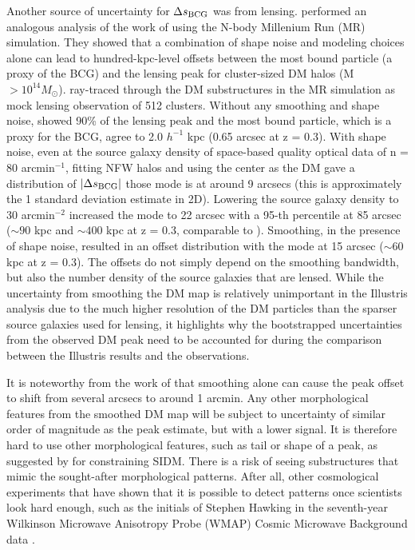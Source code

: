 Another source of uncertainty for $\Delta s_{\rm BCG}$ was from lensing. 
\cite{Dietrich2012} performed an analogous analysis of the work of \cite{Oguri2010} 
using the N-body Millenium Run (MR) simulation.
They showed that a combination of shape noise and modeling choices 
alone can lead to hundred-kpc-level offsets between the most bound particle 
(a proxy of the BCG) and the lensing peak for cluster-sized DM halos 
(M $> 10^{14 }M_\odot$).  
\cite{Dietrich2012} ray-traced through the DM substructures in the MR simulation 
as mock lensing observation of 512 clusters.  
Without any smoothing and shape noise, \cite{Dietrich2012} showed 
90\% of the lensing peak and the 
most bound particle, which is a proxy for the BCG, agree to 2.0 $h^{-1}$ kpc
(0.65 arcsec at z = 0.3). 
With shape noise,
even at the source galaxy density of space-based quality optical data of n = 80
arcmin$^{-1}$, fitting NFW halos and using the center as the DM gave a 
distribution of $|\Delta s_{\rm BCG}|$ those mode is at around 9 arcsecs (this is
approximately the 1 standard deviation estimate in 2D). 
Lowering the source galaxy density to 30 arcmin$^{-2}$ increased the mode
to 22 arcsec with a 95-th percentile at 85 arcsec 
($\sim 90$ kpc and $\sim 400$ kpc at z = 0.3, comparable to \citealt{Oguri2010}). 
Smoothing, in the presence of shape noise,
resulted in an offset distribution with the mode at
15 arcsec ($\sim 60$ kpc at z = 0.3). 
The offsets do not simply depend on the smoothing bandwidth, 
but also the number density of the source galaxies that are lensed. 
While the uncertainty from smoothing the DM map is
relatively unimportant in the Illustris analysis due to the much higher resolution 
of the DM particles than the sparser source galaxies used for lensing, it
highlights why the bootstrapped uncertainties from the observed
DM peak need to be accounted for during the comparison between the
Illustris results and the observations.

It is noteworthy from the work of \cite{Dietrich2012} that 
smoothing alone can cause the peak offset to shift from several arcsecs to
around 1 arcmin.
Any other morphological features from the smoothed DM map will be subject 
to uncertainty of similar order of magnitude as the peak
estimate, but with a lower signal. 
It is therefore hard to use other morphological features, such as tail or shape 
of a peak,
as suggested by \cite{Kahlhoefer14} for constraining SIDM.
There is a risk of seeing substructures that mimic the sought-after 
morphological patterns. After all, other cosmological experiments 
that have shown
that it is possible to detect patterns once scientists look hard enough, 
such as the initials of Stephen
Hawking in the seventh-year Wilkinson Microwave Anisotropy Probe (WMAP) 
Cosmic Microwave Background data \citep{Bennett2011}.

